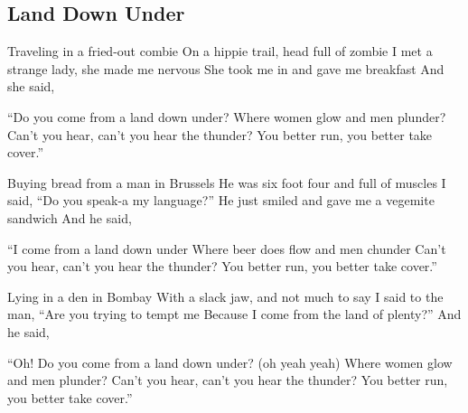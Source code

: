 \subsection*{Land Down Under   }
\begin{guitar}
Traveling in a fried-out combie
On a hippie trail, head full of zombie
I met a strange lady, she made me nervous
She took me in and gave me breakfast
And she said,


``Do you come from a land down under?
Where women glow and men plunder?
Can't you hear, can't you hear the thunder?
You better run, you better take cover.''



Buying bread from a man in Brussels
He was six foot four and full of muscles
I said, ``Do you speak-a my language?''
He just smiled and gave me a vegemite sandwich
And he said,

``I come from a land down under
Where beer does flow and men chunder
Can't you hear, can't you hear the thunder?
You better run, you better take cover.''

Lying in a den in Bombay
With a slack jaw, and not much to say
I said to the man, ``Are you trying to tempt me
Because I come from the land of plenty?''
And he said,

``Oh! Do you come from a land down under? (oh yeah yeah)
Where women glow and men plunder?
Can't you hear, can't you hear the thunder?
You better run, you better take cover.''


\end{guitar}
